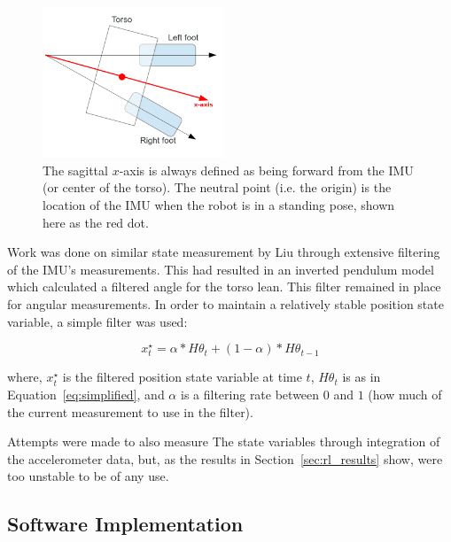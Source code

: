 \begin{figure}[h]
  \vspace{-10pt}
  \begin{center}
    \includegraphics[width=0.48\textwidth]{img/sagittal_feet.png}
  \end{center}
  \vspace{-30pt}
  \caption{The sagittal $x$-axis is always defined as being forward from the IMU (or center of the torso). The neutral point (i.e. the origin) is the location of the IMU when the robot is in a standing pose, shown here as the red dot.}
  \label{fig:sagittal}
\end{figure}

Work was done on similar state measurement by Liu\cite{liu} through extensive filtering of the IMU's measurements. This had resulted in an inverted pendulum model which calculated a filtered angle for the torso lean. This filter remained in place for angular measurements. In order to maintain a relatively stable position state variable, a simple filter was used:

\begin{equation}
x^\star_t = \alpha * H\theta_t + (1 - \alpha) * H\theta_{t-1}
\end{equation}

where, $x^\star_t$ is the filtered position state variable at time $t$, $H\theta_t$ is as in Equation~\ref{eq:simplified}, and $\alpha$ is a filtering rate between $0$ and $1$ (how much of the current measurement to use in the filter).

Attempts were made to also measure The state variables through integration of the accelerometer data, but, as the results in Section~\ref{sec:rl_results} show, were too unstable to be of any use.

\subsection{Software Implementation}

